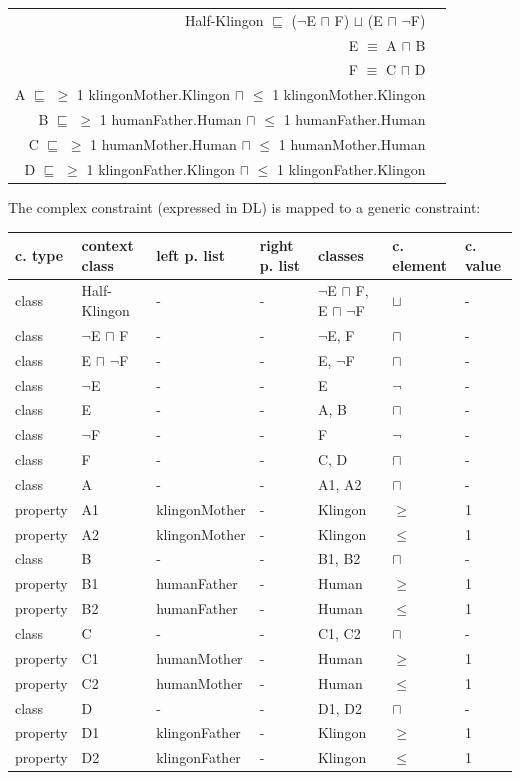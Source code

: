 \documentclass{llncs}
\newenvironment{gcotable}{
  \scriptsize
  \sffamily
  \vspace{0cm}
	\begin{center}
  \begin{tabular}{l|l|l|l|l|l|l}
  \hline
  \textbf{c. type} & \textbf{context class} & \textbf{left p. list} & \textbf{right p. list} & \textbf{classes} & \textbf{c. element} & \textbf{c. value} \\
  \hline

}{
  \hline
  \end{tabular}
	\end{center}
}
\newenvironment{DL}{
  \vspace{0cm}
	\begin{center}
  \begin{tabular}{r l}

}{
  \end{tabular}
	\end{center}
}
\begin{document}
\begin{DL}
Half-Klingon $\sqsubseteq$ ($\neg$E $\sqcap$ F) $\sqcup$ (E $\sqcap$ $\neg$F) \\ 
E $\equiv$ A $\sqcap$ B \\
F $\equiv$ C $\sqcap$ D \\
A $\sqsubseteq$ $\geq$ 1 klingonMother.Klingon $\sqcap$ $\leq$ 1 klingonMother.Klingon \\
B $\sqsubseteq$ $\geq$ 1 humanFather.Human $\sqcap$ $\leq$ 1 humanFather.Human \\
C $\sqsubseteq$ $\geq$ 1 humanMother.Human $\sqcap$ $\leq$ 1 humanMother.Human \\
D $\sqsubseteq$ $\geq$ 1 klingonFather.Klingon $\sqcap$ $\leq$ 1 klingonFather.Klingon \\
\end{DL}

The complex constraint (expressed in DL) is mapped to a generic constraint:

\begin{gcotable}
class & Half-Klingon & - & - & $\neg$E $\sqcap$ F, E $\sqcap$ $\neg$F & $\sqcup$ & - \\
class & $\neg$E $\sqcap$ F & - & - & $\neg$E, F & $\sqcap$ & - \\
class & E $\sqcap$ $\neg$F & - & - & E, $\neg$F & $\sqcap$ & - \\
class & $\neg$E & - & - & E & $\neg$ & - \\
class & E & - & - & A, B & $\sqcap$ & - \\
class & $\neg$F & - & - & F & $\neg$ & - \\
class & F & - & - & C, D & $\sqcap$ & - \\
class & A & - & - & A1, A2 & $\sqcap$ & - \\
property & A1 & klingonMother & - & Klingon & $\geq$ & 1 \\
property & A2 & klingonMother & - & Klingon & $\leq$ & 1 \\
class & B & - & - & B1, B2 & $\sqcap$ & - \\
property & B1 & humanFather & - & Human & $\geq$ & 1 \\
property & B2 & humanFather & - & Human & $\leq$ & 1 \\
class & C & - & - & C1, C2 & $\sqcap$ & - \\
property & C1 & humanMother & - & Human & $\geq$ & 1 \\
property & C2 & humanMother & - & Human & $\leq$ & 1 \\
class & D & - & - & D1, D2 & $\sqcap$ & - \\
property & D1 & klingonFather & - & Klingon & $\geq$ & 1 \\
property & D2 & klingonFather & - & Klingon & $\leq$ & 1 \\
\end{gcotable}
\end{document}
